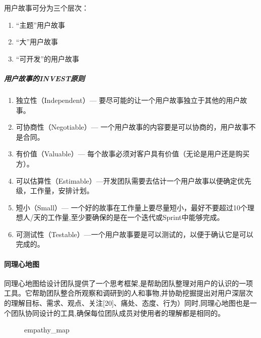 \documentclass[letterpaper,11pt,english]{sphinxmanual}
\begin{document}
用户故事可分为三个层次：
\begin{enumerate}
%
\item {} 
“主题”用户故事

\item {} 
“大”用户故事

\item {} 
“可开发”的用户故事

\end{enumerate}


\subparagraph{用户故事的INVEST原则}
\label{\detokenize{chapter_knowledge/users_analysis:invest}}\begin{enumerate}
%
\item {} 
独立性（Independent）— 要尽可能的让一个用户故事独立于其他的用户故事。

\item {} 
可协商性（Negotiable）—
一个用户故事的内容要是可以协商的，用户故事不是合同。

\item {} 
有价值（Valuable）—
每个故事必须对客户具有价值（无论是用户还是购买方）。

\item {} 
可以估算性（Estimable）—开发团队需要去估计一个用户故事以便确定优先级，工作量，安排计划。

\item {} 
短小（Small）—
一个好的故事在工作量上要尽量短小，最好不要超过10个理想人/天的工作量,至少要确保的是在一个迭代或Sprint中能够完成。

\item {} 
可测试性（Testable）—一个用户故事要是可以测试的，以便于确认它是可以完成的。

\end{enumerate}


\paragraph{同理心地图}
\label{\detokenize{chapter_knowledge/users_analysis:id10}}
同理心地图给设计团队提供了一个思考框架,是帮助团队整理对用户的认识的一项工具。它帮助团队整合所观察和调研到的人和事物,并协助挖掘提出对用户深层次的理解目标、需求、观点、关注{[}20{]}、痛处、态度、行为）同时,同理心地图也是一个团队协同设计的工具,确保每位团队成员对使用者的理解都是相同的。

\begin{figure}[H]
\centering
\capstart

\noindent{}
\caption{empathy\_map}\label{\detokenize{chapter_knowledge/users_analysis:id35}}\end{figure}
\end{document}
